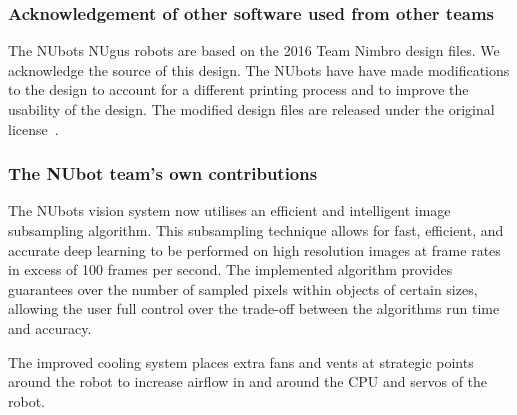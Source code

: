 \documentclass{llncs}
\begin{document}
\subsubsection{Acknowledgement of other software used from other teams}
The NUbots NUgus robots are based on the 2016 Team Nimbro design files. We acknowledge the source of this design. The NUbots have have made modifications to the design to account for a different printing process and to improve the usability of the design. The modified design files are released under the original license~\cite{nubotsHardwareGit}.

\subsubsection{The NUbot team’s own contributions}
The NUbots vision system now utilises an efficient and intelligent image subsampling algorithm. This subsampling technique allows for fast, efficient, and accurate deep learning to be performed on high resolution images at frame rates in excess of 100 frames per second. The implemented algorithm provides guarantees over the number of sampled pixels within objects of certain sizes, allowing the user full control over the trade-off between the algorithms run time and accuracy.

The improved cooling system places extra fans and vents at strategic points around the robot to increase airflow in and around the CPU and servos of the robot.







\end{document}
